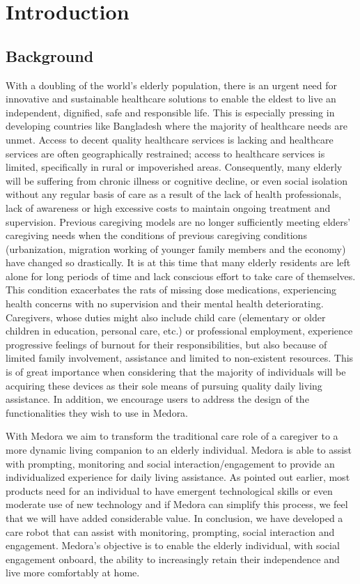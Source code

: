 \clearpage
\chapter{Introduction}
\label{chap:introduction}

\section{Background}
\label{sec:background}
With a doubling of the world's elderly population, there is an urgent need for innovative and sustainable healthcare solutions to enable the eldest to live an independent, dignified, safe and responsible life. This is especially pressing in developing countries like Bangladesh where the majority of healthcare needs are unmet. Access to decent quality healthcare services is lacking and healthcare services are often geographically restrained; access to healthcare services is limited, specifically in rural or impoverished areas. Consequently, many elderly will be suffering from chronic illness or cognitive decline, or even social isolation without any regular basis of care as a result of the lack of health professionals, lack of awareness or high excessive costs to maintain ongoing treatment and supervision. 
Previous caregiving models are no longer sufficiently meeting elders' caregiving needs when the conditions of previous caregiving conditions (urbanization, migration working of younger family members and the economy) have changed so drastically. It is at this time that many elderly residents are left alone for long periods of time and lack conscious effort to take care of themselves. This condition exacerbates the rats of missing dose medications, experiencing health concerns with no supervision and their mental health deteriorating. Caregivers, whose duties might also include child care (elementary or older children in education, personal care, etc.) or professional employment, experience progressive feelings of burnout for their responsibilities, but also because of limited family involvement, assistance and limited to non-existent resources.
This is of great importance when considering that the majority of individuals will be acquiring these devices as their sole means of pursuing quality daily living assistance. In addition, we encourage users to address the design of the functionalities they wish to use in Medora. 

With Medora we aim to transform the traditional care role of a caregiver to a more dynamic living companion to an elderly individual. Medora is able to assist with prompting, monitoring and social interaction/engagement to provide an individualized experience for daily living assistance. As pointed out earlier, most products need for an individual to have emergent technological skills or even moderate use of new technology and if Medora can simplify this process, we feel that we will have added considerable value. In conclusion, we have developed a care robot that can assist with monitoring, prompting, social interaction and engagement. Medora's objective is to enable the elderly individual, with social engagement onboard, the ability to increasingly retain their independence and live more comfortably at home.

